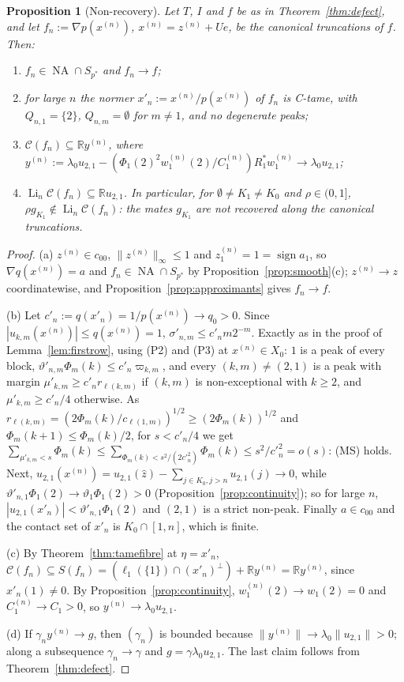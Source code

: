 \documentclass[10pt]{amsart}
\newtheorem{proposition}[theorem]{Proposition}
\theoremstyle{definition}
\theoremstyle{remark}
\newcommand{\NA}{\operatorname{NA}}
\newcommand{\sgn}{\operatorname{sign}}
\newcommand{\R}{\mathbb R}
\newcommand{\Cset}{\mathcal C}
\newcommand{\Li}{\operatorname*{Li}}
\newcommand{\zh}{\hat z}
\begin{document}
\begin{proposition}[Non-recovery]\label{prop:nonrecovery}
Let $T$, $I$ and $f$ be as in Theorem~\ref{thm:defect}, and let
$f_n:=\nabla p(x^{(n)})$, $x^{(n)}=z^{(n)}+Ue$, be the canonical truncations
of $f$.  Then:
\begin{enumerate}
\item[(a)] $f_n\in\NA\cap S_{p^*}$ and $f_n\to f$;
\item[(b)] for large $n$ the normer $x'_n:=x^{(n)}/p(x^{(n)})$ of $f_n$ is
C-tame, with $Q_{n,1}=\{2\}$, $Q_{n,m}=\emptyset$ for $m\ne1$, and no
degenerate peaks;
\item[(c)] $\Cset(f_n)\subseteq\R y^{(n)}$, where
$y^{(n)}:=\lambda_0u_{2,1}-(\Phi_1(2)^2w^{(n)}_1(2)/C^{(n)}_1)R_1^*w^{(n)}_1
\to\lambda_0u_{2,1}$;
\item[(d)] $\Li_n\Cset(f_n)\subseteq\R u_{2,1}$.  In particular, for
$\emptyset\ne K_1\ne K_0$ and $\rho\in(0,1]$, $\rho g_{K_1}\notin
\Li_n\Cset(f_n)$: the mates $g_{K_1}$ are not recovered along the canonical
truncations.
\end{enumerate}
\end{proposition}

\begin{proof}
(a) $z^{(n)}\in c_{00}$, $\|z^{(n)}\|_\infty\le1$ and $z^{(n)}_1=1=\sgn a_1$,
so $\nabla q(x^{(n)})=a$ and $f_n\in\NA\cap S_{p^*}$ by
Proposition~\ref{prop:smooth}(c); $z^{(n)}\to z$ coordinatewise, and
Proposition~\ref{prop:approximants} gives $f_n\to f$.

(b) Let $c'_n:=q(x'_n)=1/p(x^{(n)})\to q_0>0$.  Since $|u_{k,m}(x^{(n)})|
\le q(x^{(n)})=1$, $\sigma'_{n,m}\le c'_nm2^{-m}$.  Exactly as in the proof
of Lemma~\ref{lem:firstrow}, using (P2) and (P3) at $x^{(n)}\in X_0$: $1$ is a
peak of every block, $\vartheta'_{n,m}\Phi_m(k)\le c'_n\varpi_{k,m}$, and every
$(k,m)\ne(2,1)$ is a peak with margin $\mu'_{k,m}\ge c'_nr_{\ell(k,m)}$ if
$(k,m)$ is non-exceptional with $k\ge2$, and $\mu'_{k,m}\ge c'_n/4$
otherwise.  As $r_{\ell(k,m)}=(2\Phi_m(k)/c_{\ell(1,m)})^{1/2}\ge(2\Phi_m(k))^{1/2}$
and $\Phi_m(k+1)\le\Phi_m(k)/2$, for $s<c'_n/4$ we get
$\sum_{\mu'_{k,m}<s}\Phi_m(k)\le\sum_{\Phi_m(k)<s^2/(2c'^2_n)}\Phi_m(k)\le
s^2/c'^2_n=o(s)$: (MS) holds.  Next,
$u_{2,1}(x^{(n)})=u_{2,1}(\zh)-\sum_{j\in K_0,j>n}u_{2,1}(j)\to0$, while
$\vartheta'_{n,1}\Phi_1(2)\to\vartheta_1\Phi_1(2)>0$
(Proposition~\ref{prop:continuity}); so for large $n$,
$|u_{2,1}(x'_n)|<\vartheta'_{n,1}\Phi_1(2)$ and $(2,1)$ is a strict
non-peak.  Finally $a\in c_{00}$ and the contact set of $x'_n$ is
$K_0\cap[1,n]$, which is finite.

(c) By Theorem~\ref{thm:tamefibre} at $\eta=x'_n$,
$\Cset(f_n)\subseteq S(f_n)=(\ell_1(\{1\})\cap(x'_n)^\perp)+\R y^{(n)}=\R
y^{(n)}$, since $x'_n(1)\ne0$.  By Proposition~\ref{prop:continuity},
$w^{(n)}_1(2)\to w_1(2)=0$ and $C^{(n)}_1\to C_1>0$, so $y^{(n)}\to
\lambda_0u_{2,1}$.

(d) If $\gamma_ny^{(n)}\to g$, then $(\gamma_n)$ is bounded because
$\|y^{(n)}\|\to\lambda_0\|u_{2,1}\|>0$; along a subsequence $\gamma_n\to\gamma$
and $g=\gamma\lambda_0u_{2,1}$.  The last claim follows from
Theorem~\ref{thm:defect}.
\end{proof}
\end{document}

